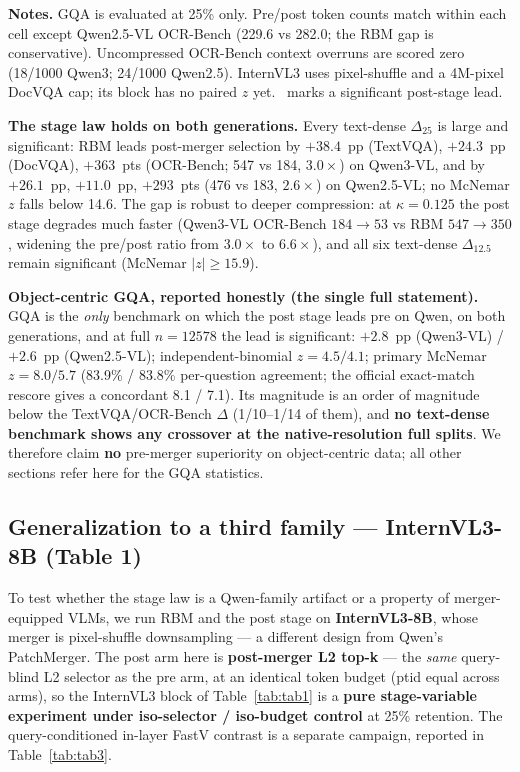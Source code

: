 \documentclass[sigconf,review,anonymous]{acmart}
\begin{document}
\begin{table}[t]
  \footnotesize
  \textbf{Notes.} GQA is evaluated at 25\% only. Pre/post token counts match
  within each cell except Qwen2.5-VL OCR-Bench (229.6 vs 282.0; the RBM gap is
  conservative). Uncompressed OCR-Bench context overruns are scored zero
  (18/1000 Qwen3; 24/1000 Qwen2.5). InternVL3 uses pixel-shuffle and a 4M-pixel
  DocVQA cap; its block has no paired $z$ yet. \dag\ marks a significant
  post-stage lead.
\end{table}

\textbf{The stage law holds on both generations.} Every text-dense
$\Delta_{25}$ is large and significant: RBM leads post-merger selection by
$+38.4$~pp (TextVQA), $+24.3$~pp (DocVQA), $+363$~pts (OCR-Bench; 547 vs 184,
$3.0\times$) on Qwen3-VL, and by $+26.1$~pp, $+11.0$~pp, $+293$~pts (476 vs 183,
$2.6\times$) on Qwen2.5-VL; no McNemar $z$ falls below 14.6. The gap is robust to
deeper compression: at $\kappa = 0.125$ the post stage degrades much faster
(Qwen3-VL OCR-Bench $184 \to 53$ vs RBM $547 \to 350$, widening the pre/post
ratio from $3.0\times$ to $6.6\times$), and all six text-dense $\Delta_{12.5}$
remain significant (McNemar $|z| \geq 15.9$).

\textbf{Object-centric GQA, reported honestly (the single full statement).} GQA
is the \emph{only} benchmark on which the post stage leads pre on Qwen, on both
generations, and at full $n = 12578$ the lead is significant: $+2.8$~pp
(Qwen3-VL) / $+2.6$~pp (Qwen2.5-VL); independent-binomial $z = 4.5 / 4.1$;
primary McNemar $z = 8.0 / 5.7$ (83.9\% / 83.8\% per-question agreement; the
official exact-match rescore gives a concordant 8.1 / 7.1). Its magnitude is an
order of magnitude below the TextVQA/OCR-Bench $\Delta$ (1/10--1/14 of them),
and \textbf{no text-dense benchmark shows any crossover at the
native-resolution full splits}. We therefore claim \textbf{no} pre-merger
superiority on object-centric data; all other sections refer here for the GQA
statistics.

\subsection{Generalization to a third family --- InternVL3-8B (Table 1)}\label{sec:internvl}

To test whether the stage law is a Qwen-family artifact or a property of
merger-equipped VLMs, we run RBM and the post stage on \textbf{InternVL3-8B},
whose merger is pixel-shuffle downsampling --- a different design from Qwen's
PatchMerger. The post arm here is \textbf{post-merger L2 top-k} --- the
\emph{same} query-blind L2 selector as the pre arm, at an identical token budget
(ptid equal across arms), so the InternVL3 block of Table~\ref{tab:tab1} is a \textbf{pure
stage-variable experiment under iso-selector / iso-budget control} at 25\%
retention. The query-conditioned in-layer FastV contrast is a separate campaign,
reported in Table~\ref{tab:tab3}.
\end{document}

